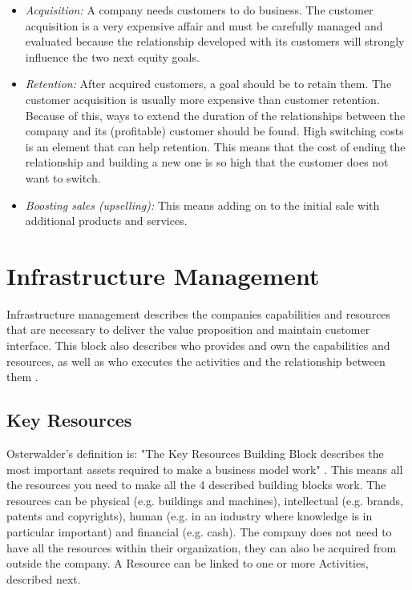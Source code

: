 \begin{itemize}
\renewcommand{\labelitemi}{$\bullet$}
\item \emph{Acquisition:} A company needs customers to do business. The customer acquisition is a very expensive affair and must be carefully managed and evaluated because the relationship developed with its customers will strongly influence the two next equity goals.
\item \emph{Retention:} After acquired customers, a goal should be to retain them. The customer acquisition is usually more expensive than customer retention. Because of this, ways to extend the duration of the relationships between the company and its (profitable) customer should be found. High switching costs is an element that can help retention. This means that the cost of ending the relationship and building a new one is so high that the customer does not want to switch.
\item \emph{Boosting sales (upselling):} This means adding on to the initial sale with additional products and services.
\end{itemize}

\section{Infrastructure Management}
Infrastructure management describes the companies capabilities and resources that are necessary to deliver the value proposition and maintain customer interface. This block also describes who provides and own the capabilities and resources, as well as who executes the activities and the relationship between them \cite{osterwalderthesis}.

\subsection{Key Resources}
Osterwalder's definition is: "The Key Resources Building Block describes the most important assets required to make a business model work" \cite{osterwalder}. This means all the resources you need to make all the 4 described building blocks work. The resources can be physical (e.g. buildings and machines), intellectual (e.g. brands, patents and copyrights), human (e.g. in an industry where knowledge is in particular important) and financial (e.g. cash). The company does not need to have all the resources within their organization, they can also be acquired from outside the company. A Resource can be linked to one or more Activities, described next.

